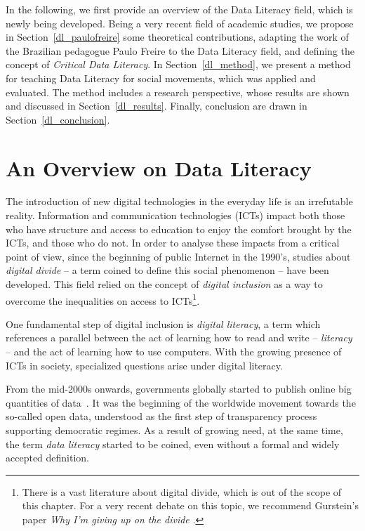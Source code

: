In the following, we first provide an overview of the Data Literacy field, which is newly being developed.
Being a very recent field of academic studies, we propose in Section~\ref{dl_paulofreire} some theoretical contributions, adapting the work of the Brazilian pedagogue Paulo Freire to the Data Literacy field, and defining the concept of \emph{Critical Data Literacy}.
In Section~\ref{dl_method}, we present a method for teaching Data Literacy for social movements, which was applied and evaluated.
The method includes a research perspective, whose results are shown and discussed in Section~\ref{dl_results}.
Finally, conclusion are drawn in Section~\ref{dl_conclusion}.


\section{An Overview on Data Literacy}
\label{dl_overview} 

The introduction of new digital technologies in the everyday life is an irrefutable reality. 
Information and communication technologies (ICTs) impact both those who have structure and access to education to enjoy the comfort brought by the ICTs, and those who do not. In order to analyse these impacts from a critical point of view, since the beginning of public Internet in the 1990's, studies about \emph{digital divide} -- a term coined to define this social phenomenon -- have been developed. 
This field relied on the concept of \emph{digital inclusion} as a way to overcome the inequalities on access to ICTs\footnote{There is a vast literature about digital divide, which is out of the scope of this chapter. 
For a very recent debate on this topic, we recommend Gurstein's paper \emph{Why I'm giving up on the divide} \cite{Gurstein2015}.}.

One fundamental step of digital inclusion is \emph{digital literacy}, a term which references a parallel between the act of learning how to read and write – \emph{literacy} –  and the act of learning how to use computers. With the growing presence of ICTs in society, specialized questions arise under digital literacy. 

From the mid-2000s onwards, governments globally started to publish online big quantities of data~\cite{Chignard2013}. 
It was the beginning of the worldwide movement towards the so-called open data, understood as the first step of transparency process supporting democratic regimes. 
As a result of growing need, at the same time, the term \emph{data literacy} started to be coined, even without a formal and widely accepted definition. 

